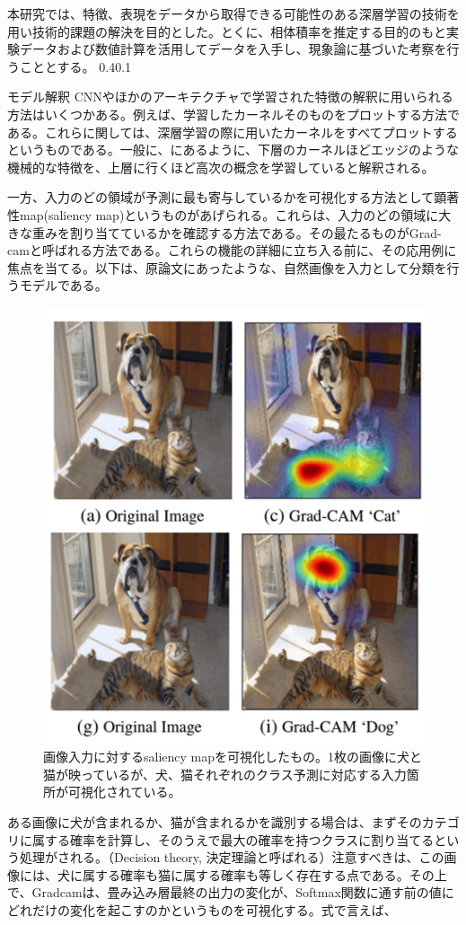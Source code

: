 \documentclass[uplatex]{suribt}
\makeatletter
\renewcommand{\subsection}{%
    \@startsection{subsection}{1}{\z@}%
    {0.4\Cvs}{0.1\Cvs}%
    {\normalfont\normalsize\headfont\raggedright}}
\makeatother
\begin{document}
本研究では、特徴、表現をデータから取得できる可能性のある深層学習の技術を用い技術的課題の解決を目的とした。とくに、相体積率を推定する目的のもと実験データおよび数値計算を活用してデータを入手し、現象論に基づいた考察を行うこととする。
\subsection{モデル解釈}
CNNやほかのアーキテクチャで学習された特徴の解釈に用いられる方法はいくつかある。例えば、学習したカーネルそのものをプロットする方法である。これらに関しては、深層学習の際に用いたカーネルをすべてプロットするというものである。一般に、\cite{Bishop:DeepLearning24}にあるように、下層のカーネルほどエッジのような機械的な特徴を、上層に行くほど高次の概念を学習していると解釈される。\par
一方、入力のどの領域が予測に最も寄与しているかを可視化する方法として顕著性map(saliency map)というものがあげられる。これらは、入力のどの領域に大きな重みを割り当てているかを確認する方法である。その最たるものがGrad-cam\cite{Selvaraju_2019}と呼ばれる方法である。これらの機能の詳細に立ち入る前に、その応用例に焦点を当てる。以下は、原論文にあったような、自然画像を入力として分類を行うモデルである。
\begin{figure}[htbp]
    \centering
    \includegraphics[width=0.5\linewidth]{pictures/explanation/grad_cam_explained.png}
    \caption{画像入力に対するsaliency mapを可視化したもの。1枚の画像に犬と猫が映っているが、犬、猫それぞれのクラス予測に対応する入力箇所が可視化されている。}
    \label{fig:gradcam}
\end{figure}
ある画像に犬が含まれるか、猫が含まれるかを識別する場合は、まずそのカテゴリに属する確率を計算し、そのうえで最大の確率を持つクラスに割り当てるという処理がされる。（Decision theory, 決定理論と呼ばれる）注意すべきは、この画像には、犬に属する確率も猫に属する確率も等しく存在する点である。その上で、Gradcamは、畳み込み層最終の出力の変化が、Softmax関数に通す前の値にどれだけの変化を起こすのかというものを可視化する。式で言えば、
\end{document}
